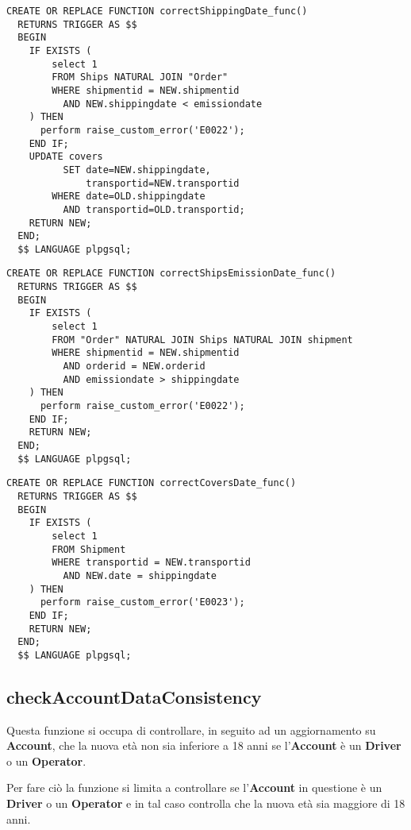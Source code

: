 \begin{lstlisting}[caption={Funzione \textbf{correctShippingDate}}]
  CREATE OR REPLACE FUNCTION correctShippingDate_func()
  RETURNS TRIGGER AS $$
  BEGIN
    IF EXISTS (
        select 1 
        FROM Ships NATURAL JOIN "Order"
        WHERE shipmentid = NEW.shipmentid
          AND NEW.shippingdate < emissiondate
    ) THEN
      perform raise_custom_error('E0022');
    END IF;
    UPDATE covers 
          SET date=NEW.shippingdate, 
              transportid=NEW.transportid 
        WHERE date=OLD.shippingdate 
          AND transportid=OLD.transportid;
    RETURN NEW;
  END;
  $$ LANGUAGE plpgsql;
\end{lstlisting}

\begin{lstlisting}[caption={Funzione \textbf{correctShipsEmissionDate}}]
  CREATE OR REPLACE FUNCTION correctShipsEmissionDate_func()
  RETURNS TRIGGER AS $$
  BEGIN
    IF EXISTS (
        select 1 
        FROM "Order" NATURAL JOIN Ships NATURAL JOIN shipment
        WHERE shipmentid = NEW.shipmentid 
          AND orderid = NEW.orderid
          AND emissiondate > shippingdate
    ) THEN
      perform raise_custom_error('E0022');
    END IF;
    RETURN NEW;
  END;
  $$ LANGUAGE plpgsql;
\end{lstlisting}

\begin{lstlisting}[caption={Funzione \textbf{correctCoversDate}}]
  CREATE OR REPLACE FUNCTION correctCoversDate_func()
  RETURNS TRIGGER AS $$
  BEGIN
    IF EXISTS (
        select 1 
        FROM Shipment
        WHERE transportid = NEW.transportid
          AND NEW.date = shippingdate
    ) THEN
      perform raise_custom_error('E0023');
    END IF;
    RETURN NEW;
  END;
  $$ LANGUAGE plpgsql;
\end{lstlisting}

\subsection{\textbf{checkAccountDataConsistency}}

Questa funzione si occupa di controllare, in seguito ad un aggiornamento su \textbf{Account}, che la nuova età non sia inferiore a 18 anni se l'\textbf{Account} è un \textbf{Driver} o un \textbf{Operator}.

Per fare ciò la funzione si limita a controllare se l'\textbf{Account} in questione è un \textbf{Driver} o un \textbf{Operator} e in tal caso controlla che la nuova età sia maggiore di 18 anni.

